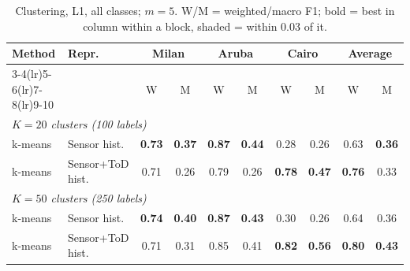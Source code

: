 \begin{table}[H]
\centering\small
\caption{Clustering, L1, all classes; $m=5$. W/M = weighted/macro F1; bold = best in column within a block, shaded = within 0.03 of it.}
\label{tab:clu_l1_all_m5}
\setlength{\tabcolsep}{3.5pt}
\begin{tabular}{llcc|cc|cc|cc}
\toprule
Method & Repr. & \multicolumn{2}{c}{Milan} & \multicolumn{2}{c}{Aruba} & \multicolumn{2}{c}{Cairo} & \multicolumn{2}{c}{Average} \\
\cmidrule(lr){3-4}\cmidrule(lr){5-6}\cmidrule(lr){7-8}\cmidrule(lr){9-10}
 & & W & M & W & M & W & M & W & M \\
\midrule
\multicolumn{10}{l}{\textit{$K = 20$ clusters (100 labels)}} \\
\midrule
k-means & Sensor hist. & \cellcolor{blue!12}\textbf{0.73} & \cellcolor{blue!12}\textbf{0.37} & \cellcolor{blue!12}\textbf{0.87} & \cellcolor{blue!12}\textbf{0.44} & 0.28 & 0.26 & 0.63 & \cellcolor{blue!12}\textbf{0.36} \\
k-means & Sensor+ToD hist. & \cellcolor{blue!12}0.71 & 0.26 & 0.79 & 0.26 & \cellcolor{blue!12}\textbf{0.78} & \cellcolor{blue!12}\textbf{0.47} & \cellcolor{blue!12}\textbf{0.76} & \cellcolor{blue!12}0.33 \\
\midrule
\multicolumn{10}{l}{\textit{$K = 50$ clusters (250 labels)}} \\
\midrule
k-means & Sensor hist. & \cellcolor{blue!12}\textbf{0.74} & \cellcolor{blue!12}\textbf{0.40} & \cellcolor{blue!12}\textbf{0.87} & \cellcolor{blue!12}\textbf{0.43} & 0.30 & 0.26 & 0.64 & 0.36 \\
k-means & Sensor+ToD hist. & \cellcolor{blue!12}0.71 & 0.31 & \cellcolor{blue!12}0.85 & \cellcolor{blue!12}0.41 & \cellcolor{blue!12}\textbf{0.82} & \cellcolor{blue!12}\textbf{0.56} & \cellcolor{blue!12}\textbf{0.80} & \cellcolor{blue!12}\textbf{0.43} \\
\bottomrule
\end{tabular}
\end{table}

